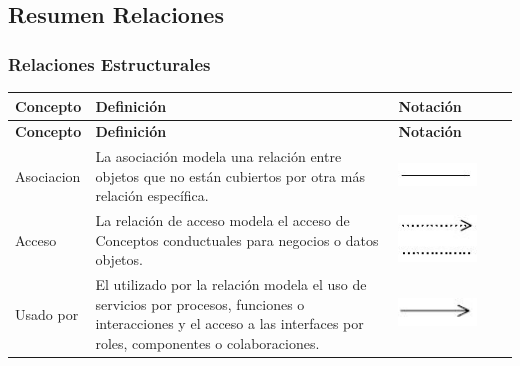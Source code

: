 \subsection{Resumen Relaciones}

\subsubsection{Relaciones Estructurales}
\begin{center}
	\begin{longtable}[H]{| >{\centering\arraybackslash}m{3cm} | >{\arraybackslash}m{6cm} | p{4cm} | p{5cm} | p{4cm} |}
		
		\hline
		\textbf{Concepto} &  \centering \textbf{Definición} & \textbf{Notación} \\
		\hline
		\endfirsthead
		
		
		\hline
		\textbf{Concepto} &  \centering \textbf{Definición} & \textbf{Notación} \\
		\hline
		\endhead
		
		Asociacion       
		& \vspace{1mm} La asociación modela una relación entre
		objetos que no están cubiertos por otra más
		relación específica.        
		&\includegraphics[width=30mm,trim=0 0 0 -2mm]{imagenes/lenguaje/relaciones/asociacion}  \\ \hline
		
		Acceso
		& \vspace{1mm} La relación de acceso modela el acceso de
		Conceptos conductuales para negocios o datos
		objetos.            
		& \includegraphics[width=35mm,trim=0 0 0 -2mm]{imagenes/lenguaje/relaciones/acceso}  \\ \hline
		
		Usado por        
		&\vspace{1mm} El utilizado por la relación modela el uso de
		servicios por procesos, funciones o
		interacciones y el acceso a las interfaces por
		roles, componentes o colaboraciones.               
		& \includegraphics[width=25mm,trim=0 0 0 -2mm]{imagenes/lenguaje/relaciones/usadopor}  \\ \hline
		

\end{longtable}
\end{center}
